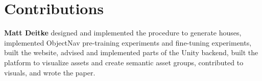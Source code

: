 \documentclass{article}
\begin{document}







\newpage

\section*{Contributions}

\textbf{Matt Deitke} designed and implemented the procedure to generate houses, implemented ObjectNav pre-training experiments and fine-tuning experiments, built the website, advised and implemented parts of the Unity backend, built the platform to visualize assets and create semantic asset groups, contributed to visuals, and wrote the paper.
\end{document}
